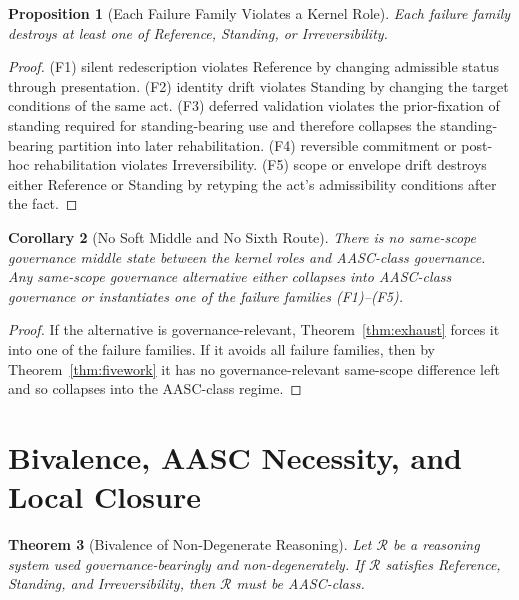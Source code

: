 \documentclass[11pt]{article}
\newtheorem{theorem}{Theorem}[section]
\newtheorem{proposition}[theorem]{Proposition}
\newtheorem{corollary}[theorem]{Corollary}
\begin{document}
\begin{proposition}[Each Failure Family Violates a Kernel Role]
\label{prop:failurekernel}
Each failure family destroys at least one of Reference, Standing, or Irreversibility.
\end{proposition}

\begin{proof}
\textup{(F1)} silent redescription violates Reference by changing admissible status through presentation. \textup{(F2)} identity drift violates Standing by changing the target conditions of the same act. \textup{(F3)} deferred validation violates the prior-fixation of standing required for standing-bearing use and therefore collapses the standing-bearing partition into later rehabilitation. \textup{(F4)} reversible commitment or post-hoc rehabilitation violates Irreversibility. \textup{(F5)} scope or envelope drift destroys either Reference or Standing by retyping the act's admissibility conditions after the fact.
\end{proof}

\begin{corollary}[No Soft Middle and No Sixth Route]
\label{cor:nosoftmiddle}
There is no same-scope governance middle state between the kernel roles and AASC-class governance. Any same-scope governance alternative either collapses into AASC-class governance or instantiates one of the failure families \textup{(F1)}--\textup{(F5)}.
\end{corollary}

\begin{proof}
If the alternative is governance-relevant, Theorem~\ref{thm:exhaust} forces it into one of the failure families. If it avoids all failure families, then by Theorem~\ref{thm:fivework} it has no governance-relevant same-scope difference left and so collapses into the AASC-class regime.
\end{proof}

\section{Bivalence, AASC Necessity, and Local Closure}

\begin{theorem}[Bivalence of Non-Degenerate Reasoning]
\label{thm:bivalence}
Let $\mathcal{R}$ be a reasoning system used governance-bearingly and non-degenerately. If $\mathcal{R}$ satisfies Reference, Standing, and Irreversibility, then $\mathcal{R}$ must be AASC-class.
\end{theorem}
\end{document}
